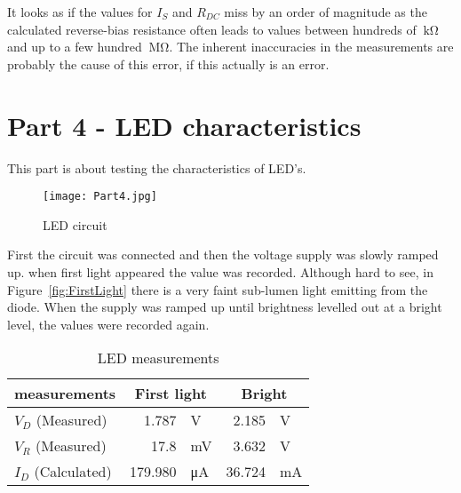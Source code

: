 \documentclass{article}
\begin{document}
It looks as if the values for \(I_S\) and \(R_{DC}\) miss by an order of magnitude as the calculated reverse-bias resistance often leads to values between hundreds of \(\SI{}{\kilo\ohm}\) and up to a few hundred \(\SI{}{\mega\ohm}\). The inherent inaccuracies in the measurements are probably the cause of this error, if this actually is an error.


\section{Part 4 - LED characteristics}
This part is about testing the characteristics of LED's. 

\begin{figure}[h] %
    \centering
    \texttt{[image: Part4.jpg]}
    \caption{LED circuit}
    \label{fig:Part4}
\end{figure}

First the circuit was connected and then the voltage supply was slowly ramped up. when first light appeared the value was recorded. Although hard to see, in Figure~\ref{fig:FirstLight} there is a very faint sub-lumen light emitting from the diode. When the supply was ramped up until brightness levelled out at a bright level, the values were recorded again.

\clearpage

\begin{table}[htbp] %
  \centering
  \caption{LED measurements}
    \begin{tabular}{|l|rl|rl|}
    \hline
    measurements & \multicolumn{2}{c|}{First light} & \multicolumn{2}{c|}{Bright} \bigstrut\\
    \hline
    \(V_D\) (Measured)   & 1.787   & V   & 2.185  & V \bigstrut\\
    \hline
    \(V_R\) (Measured)   & 17.8    & mV  & 3.632  & V \bigstrut\\
    \hline
    \(I_D\) (Calculated) & 179.980 & μA  & 36.724 & mA \bigstrut\\
    \hline
    \end{tabular}%
  \label{tab:part4}%
\end{table}%
\end{document}
